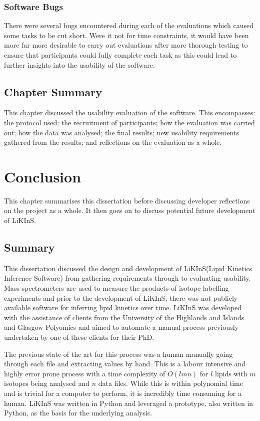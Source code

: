 \documentclass{l4proj}
\begin{document}
\subsection{Software Bugs}\label{bugs}
There were several bugs encountered during each of the evaluations which caused some tasks to be cut short. Were it not for time constraints, it would have been more far more desirable to carry out evaluations after more thorough testing to ensure that participants could fully complete each task as this could lead to further insights into the usability of the software.

\section{Chapter Summary}
This chapter discussed the usability evaluation of the software. This encompasses: the protocol used; the recruitment of participants; how the evaluation was carried out; how the data was analysed; the final results; new usability requirements gathered from the results; and reflections on the evaluation as a whole.


\chapter{Conclusion}
This chapter summarises this dissertation before discussing developer reflections on the project as a whole. It then goes on to discuss potential future development of LiKInS.
\section{Summary}
This dissertation discussed the design and development of LiKInS(Lipid Kinetics Inference Software) from gathering requirements through to evaluating usability. Mass-spectrometers are used to measure the products of isotope labelling experiments and prior to the development of LiKInS, there was not publicly available software for inferring lipid kinetics over time. LiKInS was developed with the assistance of clients from the University of the Highlands and Islands and Glasgow Polyomics and aimed to automate a manual process previously undertaken by one of these clients for their PhD.

The previous state of the art for this process was a human manually going through each file and extracting values by hand. This is a labour intensive and highly error prone process with a time complexity of $O(lmn)$ for $l$ lipids with $m$ isotopes being analysed and $n$ data files. While this is within polynomial time and is trivial for a computer to perform, it is incredibly time consuming for a human. LiKInS was written in Python and leveraged a prototype, also written in Python, as the basis for the underlying analysis.
\end{document}
